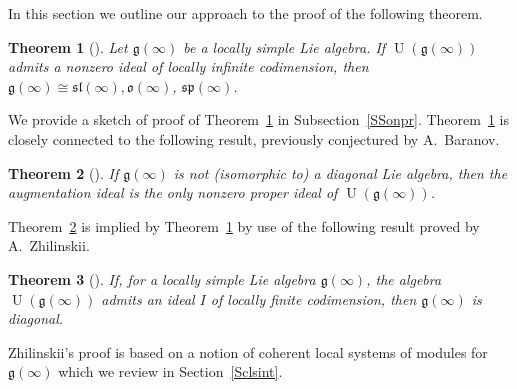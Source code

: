 \documentclass{emsprocart}
\newtheorem{theorem}{Theorem}[section]
\begin{document}
In this section we outline our approach to the proof of the following theorem.
\begin{theorem}[\cite{PP1}]\label{T31} Let $\mathfrak g(\infty)$ be a locally simple Lie algebra. If $\operatorname{U}(\mathfrak g(\infty))$ admits a nonzero ideal of locally infinite codimension, then $\mathfrak g(\infty)\cong\mathfrak{sl}(\infty), \mathfrak o(\infty)$, $\mathfrak{sp}(\infty)$.\end{theorem}

We provide a sketch of proof of Theorem~\ref{T31} in Subsection~\ref{SSonpr}. Theorem~\ref{T31} is closely connected to the following result, previously conjectured by A.~Baranov.

\begin{theorem}[\cite{PP1}] \label{T32}If $\mathfrak g(\infty)$ is not (isomorphic to) a diagonal Lie algebra, then the augmentation ideal is the only nonzero proper ideal of $\operatorname{U}(\mathfrak g(\infty))$.\end{theorem}

Theorem~\ref{T32} is implied by Theorem~\ref{T31} by use of the following result proved by A.~Zhilinskii.

\begin{theorem}[\cite{Zh2}]If, for a locally simple Lie algebra $\mathfrak g(\infty)$, the algebra $\operatorname{U}(\mathfrak g(\infty))$ admits an ideal $I$ of locally finite codimension, then $\mathfrak g(\infty)$ is diagonal.\end{theorem}
Zhilinskii's proof is based on a notion of coherent local systems of modules for $\mathfrak g(\infty)$ which we review in Section~\ref{Sclsint}.

\end{document}
